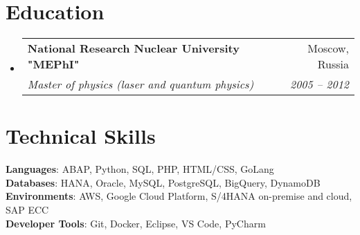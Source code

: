 \documentclass[letterpaper,11pt]{article}
\makeatletter
\newcommand{\resumeSubheading}[4]{
  \vspace{-2pt}\item
    \begin{tabular*}{0.97\textwidth}[t]{l@{\extracolsep{\fill}}r}
      \textbf{#1} & #2 \\
      \textit{\small#3} & \textit{\small #4} \\
    \end{tabular*}\vspace{-7pt}
}
\newcommand{\resumeSubHeadingListStart}{\begin{itemize}[leftmargin=0.15in, label={}]}
\newcommand{\resumeSubHeadingListEnd}{\end{itemize}}
\makeatother
\begin{document}
\section{Education}
  \resumeSubHeadingListStart
    \resumeSubheading
      {National Research Nuclear University "MEPhI"}{Moscow, Russia}
      {Master of physics (laser and quantum physics)}{2005 -- 2012}
  \resumeSubHeadingListEnd

\section{Technical Skills}
 \begin{itemize}[leftmargin=0.15in, label={}]
    \small{\item{
     \textbf{Languages}{: ABAP, Python, SQL, PHP, HTML/CSS, GoLang} \\
     \textbf{Databases}{: HANA, Oracle, MySQL, PostgreSQL, BigQuery, DynamoDB } \\
     \textbf{Environments}{: AWS, Google Cloud Platform, S/4HANA on-premise and cloud, SAP ECC} \\
     \textbf{Developer Tools}{: Git, Docker, Eclipse, VS Code, PyCharm} \\
    }}
 \end{itemize}


\end{document}

